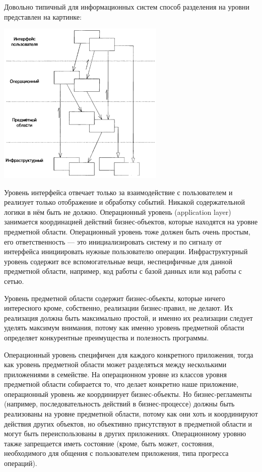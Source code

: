 \documentclass[a5paper]{article}
\begin{document}
Довольно типичный для информационных систем способ разделения на уровни представлен на картинке:

\begin{center}
    \includegraphics[width=0.6\textwidth]{layers.png}
\end{center}

Уровень интерфейса отвечает только за взаимодействие с пользователем и реализует только отображение и обработку событий. Никакой содержательной логики в нём быть не должно. Операционный уровень (application layer) занимается координацией действий бизнес-объектов, которые находятся на уровне предметной области. Операционный уровень тоже должен быть очень простым, его ответственность --- это инициализировать систему и по сигналу от интерфейса инициировать нужные пользователю операции. Инфраструктурный уровень содержит все вспомогательные вещи, неспецифичные для данной предметной области, например, код работы с базой данных или код работы с сетью.

Уровень предметной области содержит бизнес-объекты, которые ничего интересного кроме, собственно, реализации бизнес-правил, не делают. Их реализация должна быть максимально простой, и именно их реализации следует уделять максимум внимания, потому как именно уровень предметной области определяет конкурентные преимущества и полезность программы.

Операционный уровень специфичен для каждого конкретного приложения, тогда как уровень предметной области может разделяться между несколькими приложениями в семействе. На операционном уровне из классов уровня предметной области собирается то, что делает конкретно наше приложение, операционный уровень же координирует бизнес-объекты. Но бизнес-регламенты (например, последовательность действий в бизнес-процессе) должны быть реализованы на уровне предметной области, потому как они хоть и координируют действия других объектов, но объективно присутствуют в предметной области и могут быть переиспользованы в других приложениях. Операционному уровню также запрещается иметь состояние (кроме, быть может, состояния, необходимого для общения с пользователем приложения, типа прогресса операций).
\end{document}
